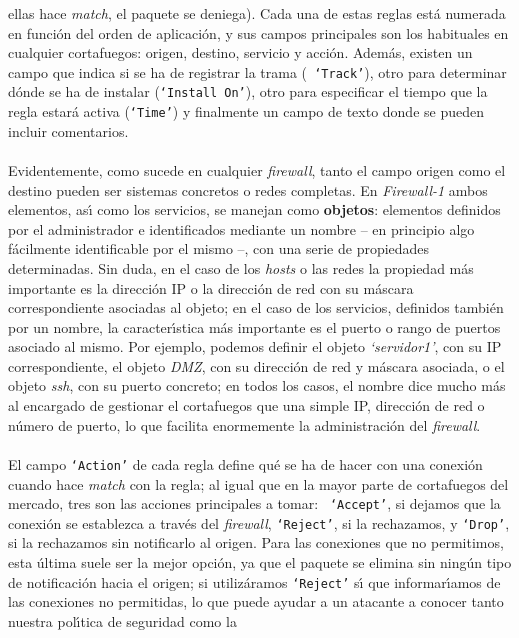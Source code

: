 ellas hace {\it match}, el paquete se deniega). Cada una de estas reglas est\'a
numerada en funci\'on del orden de aplicaci\'on, y sus campos principales son 
los habituales en cualquier cortafuegos: origen, destino, servicio y acci\'on.
Adem\'as, existen un campo que indica si se ha de registrar la trama ({\tt 
`Track'}), otro para determinar d\'onde se ha de instalar ({\tt `Install On'}), 
otro para especificar el tiempo que la regla estar\'a activa ({\tt `Time'}) y
finalmente un campo de texto donde se pueden incluir comentarios.\\
\\Evidentemente, como sucede en cualquier {\it firewall}, tanto el campo origen 
como el destino pueden ser sistemas concretos o redes completas. En {\it 
Firewall-1} ambos elementos, as\'{\i} como los servicios, se manejan como {\bf 
objetos}: elementos definidos por el administrador e identificados mediante un
nombre -- en principio algo f\'acilmente identificable por el mismo --, con una
serie de propiedades determinadas. Sin duda, en el caso de los {\it hosts} o las
redes la propiedad m\'as importante es la direcci\'on IP o la direcci\'on de 
red con su m\'ascara correspondiente asociadas al objeto; en el caso de los
servicios, definidos tambi\'en por un nombre, la caracter\'{\i}stica m\'as
importante es el puerto o rango de puertos asociado al mismo. Por ejemplo, 
podemos definir el objeto {\it `servidor1'}, con su IP correspondiente, el 
objeto {\it DMZ}, con su direcci\'on de red y m\'ascara asociada, o el objeto
{\it ssh}, con su puerto concreto; en todos los casos, el nombre dice mucho 
m\'as al encargado de gestionar el cortafuegos que una simple IP, direcci\'on 
de red o n\'umero de puerto, lo que facilita enormemente la administraci\'on 
del {\it firewall}.\\
\\El campo {\tt `Action'} de cada regla define qu\'e se ha de hacer con una
conexi\'on cuando hace {\it match} con la regla; al igual que en la mayor parte
de cortafuegos del mercado, tres son las acciones principales a tomar: {\tt
`Accept'}, si dejamos que la conexi\'on se establezca a trav\'es del {\it 
firewall}, {\tt `Reject'}, si la rechazamos, y {\tt `Drop'}, si la rechazamos 
sin notificarlo al origen. Para las conexiones que no permitimos, esta \'ultima
suele ser la mejor opci\'on, ya que el paquete se elimina sin ning\'un tipo de
notificaci\'on hacia el origen; si utiliz\'aramos {\tt `Reject'} s\'{\i} que
informar\'{\i}amos de las conexiones no permitidas, lo que puede ayudar a un
atacante a conocer tanto nuestra pol\'{\i}tica de seguridad como la 
